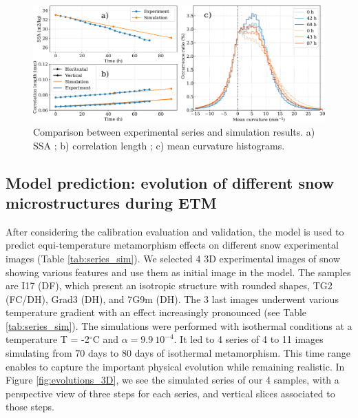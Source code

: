 \documentclass[draft,ms]{agujournal2019}
\begin{document}

\begin{figure}
    \centering
    \includegraphics[width=\linewidth]{Figures/eboni_courbes_lc_ssa_histo.pdf}
    \caption{Comparison between \protect{} experimental series and simulation results. a) SSA ; b) correlation length ; c) mean curvature histograms.}
    \label{fig:eboni}
\end{figure}


\subsection{Model prediction: evolution of different snow microstructures during ETM}
\label{sec:prediction}

After considering the calibration evaluation and validation, the model is used to predict equi-temperature metamorphism effects on different snow experimental images (Table \ref{tab:series_sim}). We selected 4 3D experimental images of snow showing various features and use them as initial image in the model. The samples are I17 (DF), which present an isotropic structure with rounded shapes, TG2 (FC/DH), Grad3 (DH), and 7G9m (DH). The 3 last images underwent various temperature gradient with an effect increasingly pronounced (see Table \ref{tab:series_sim}). The simulations were performed with isothermal conditions at a temperature T = -2$^\circ$C and $\alpha = 9.9\ 10^{-4}$. It led to 4 series of 4 to 11 images simulating from 70 days to 80 days of isothermal metamorphism. This time range enables to capture the important physical evolution while remaining realistic. In Figure \ref{fig:evolutions_3D}, we see the simulated series of our 4 samples, with a perspective view of three steps for each series, and vertical slices associated to those steps.\\
\end{document}

